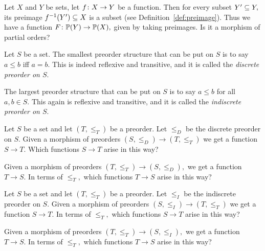 \documentclass[CT4S-EN-RU]{subfiles}
\begin{document}
\begin{applicationRUS}
\end{applicationRUS}

\begin{exerciseENG}
Let $X$ and $Y$ be sets, let $f\taking X\to Y$ be a function. Then for every subset $Y'\ss Y,$ its preimage $f^\m1(Y')\ss X$ is a subset (see Definition~\ref{def:preimage}). Thus we have a function $F\taking\PP(Y)\to\PP(X),$ given by taking preimages. Is it a morphism of partial orders?
\end{exerciseENG}

\begin{exerciseRUS}
\end{exerciseRUS}

\begin{exampleENG}\label{ex:discrete and indiscrete}
Let $S$ be a set. The smallest preorder structure that can be put on $S$ is to say $a\leq b$ iff $a=b.$ This is indeed reflexive and transitive, and it is called the {\em discrete preorder on $S$}.

The largest preorder structure that can be put on $S$ is to say $a\leq b$ for all $a,b\in S.$ This again is reflexive and transitive, and it is called the {\em indiscrete preorder on $S$}.
\end{exampleENG}

\begin{exampleRUS}\label{ex:discrete and indiscrete}
\end{exampleRUS}

\begin{exerciseENG}
Let $S$ be a set and let $(T,\leq_T)$ be a preorder. Let $\leq_D$ be the discrete preorder on $S.$ Given a morphism of preorders $(S,\leq_D)\to (T,\leq_T)$ we get a function $S\to T.$ 
\sexc Which functions $S\to T$ arise in this way? 
\item Given a morphism of preorders $(T,\leq_T)\to(S,\leq_D),$ we get a function $T\to S.$ In terms of $\leq_T,$ which functions $T\to S$ arise in this way?
\endsexc
\end{exerciseENG}

\begin{exerciseRUS}
\end{exerciseRUS}

\begin{exerciseENG}
Let $S$ be a set and let $(T,\leq_T)$ be a preorder. Let $\leq_I$ be the indiscrete preorder on $S.$ Given a morphism of preorders $(S,\leq_I)\to (T,\leq_T)$ we get a function $S\to T.$ 
\sexc In terms of $\leq_T,$ which functions $S\to T$ arise in this way? 
\item Given a morphism of preorders $(T,\leq_T)\to(S,\leq_I),$ we get a function $T\to S.$ In terms of $\leq_T,$ which functions $T\to S$ arise in this way?
\endsexc
\end{exerciseENG}
\end{document}
